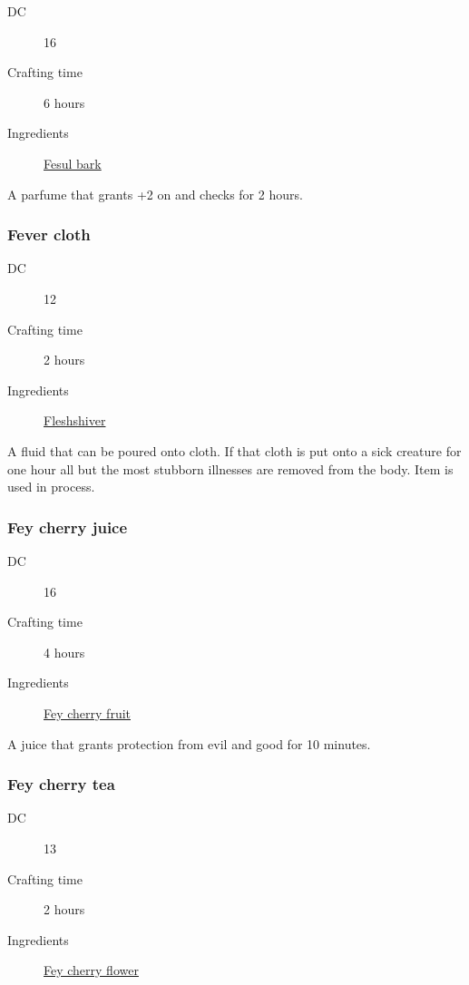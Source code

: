 \begin{description}
\item [DC] 16 \nature
\item [Crafting time] 6 hours
\item [Ingredients] \hyperref[Fesul]{Fesul bark}
\end{description}

A parfume that grants +2 on \persuasion and \performance checks for 2 hours.

\subsubsection{Fever cloth}
\label{Fever cloth}

\begin{description}
\item [DC] 12 \medicine
\item [Crafting time] 2 hours
\item [Ingredients] \hyperref[Fleshshiver]{Fleshshiver}
\end{description}

A fluid that can be poured onto cloth. If that cloth is put onto a sick creature for one hour
 all but the most stubborn illnesses are removed from the body. Item is used in process.

\subsubsection{Fey cherry juice}
\label{Fey cherry juice}

\begin{description}
\item [DC] 16 \religion
\item [Crafting time] 4 hours
\item [Ingredients] \hyperref[Fey cherry]{Fey cherry fruit}
\end{description}

A juice that grants protection from evil and good for 10 minutes.

\subsubsection{Fey cherry tea}
\label{Fey cherry tea}

\begin{description}
\item [DC] 13 \arcana
\item [Crafting time] 2 hours
\item [Ingredients] \hyperref[Fey cherry]{Fey cherry flower}
\end{description}

